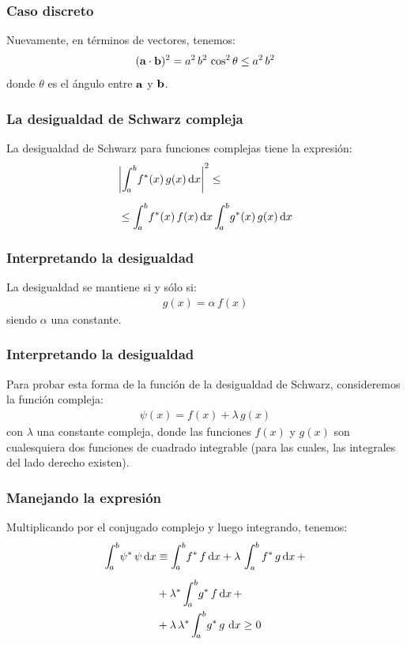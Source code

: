 \documentclass[12pt]{beamer}
\begin{document}
\begin{frame}
\frametitle{Caso discreto}
Nuevamente, en términos de vectores, tenemos:
\pause
\begin{align}
( \vb{a} \cdot \vb{b} )^{2} =  a^{2} \, b^{2} \, \cos^{2} \theta \leq a^{2} \, b^{2}
\label{eq:ecuacion_10_77}
\end{align}
donde $\theta$ es el ángulo entre $\vb{a}$ y $\vb{b}$.
\end{frame}
\begin{frame}
\frametitle{La desigualdad de Schwarz compleja}
La desigualdad de Schwarz para funciones complejas tiene la expresión:
\pause
\begin{align}
\begin{aligned}[b]
&\abs{ \scaleint{5ex}_{\bs a}^{b} f^{*} (x) \, g (x) \dd{x} }^{2} \leq \\[0.5em]
&\leq \scaleint{5ex}_{\bs a}^{b} f^{*} (x) \, f (x) \dd{x} \scaleint{5ex}_{\bs a}^{b} g^{*} (x) \, g (x) \dd{x}
\end{aligned}
\label{eq:ecuacion_10_78}
\end{align}
\end{frame}
\begin{frame}
\frametitle{Interpretando la desigualdad}
La desigualdad se mantiene si y sólo si:
\begin{align*}
g (x) = \alpha \, f (x)
\end{align*}
siendo $\alpha$ una constante.
\end{frame}
\begin{frame}
\frametitle{Interpretando la desigualdad}
Para probar esta forma de la función de la desigualdad de Schwarz, consideremos la función compleja:
\pause
\begin{align*}
\psi (x) = f(x) + \lambda \, g (x)
\end{align*}
con $\lambda$ una constante compleja, donde las funciones $f (x)$ y $g (x)$ son cualesquiera dos funciones de cuadrado integrable (para las cuales, las integrales del lado derecho existen).
\end{frame}
\begin{frame}
\frametitle{Manejando la expresión}
Multiplicando por el conjugado complejo y luego integrando, tenemos:
\pause
\begin{align}
\begin{aligned}
\scaleint{5ex}_{\bs a}^{b} \psi^{*} \, \psi \dd{x} &\equiv \scaleint{5ex}_{\bs a}^{b} f^{*} \, f \dd{x} + \lambda \, \int_{a}^{b} f^{*} \, g \dd{x} + \\[0.5em]
&+ \lambda^{*} \, \scaleint{5ex}_{\bs a}^{b} g^{*} \, f \dd{x} + \\
&+ \lambda \, \lambda^{*} \, \scaleint{5ex}_{\bs a}^{b} g^{*} \, g \, \dd{x}  \geq 0
\end{aligned}
\label{eq:ecuacion_10_79}
\end{align}
\end{frame}
\end{document}
